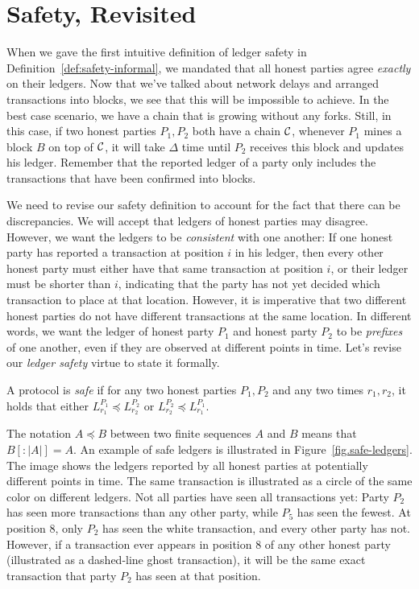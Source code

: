 \section{Safety, Revisited}

When we gave the first intuitive definition of ledger safety in Definition~\ref{def:safety-informal}, we mandated that all honest parties
agree \emph{exactly} on their ledgers. Now that we've talked about network delays and arranged transactions into blocks, we see
that this will be impossible to achieve. In the best case scenario, we have a chain that is growing without any forks. Still, in this
case, if two honest parties $P_1, P_2$ both have a chain $\mathcal{C}$, whenever $P_1$ mines a block $B$ on top of $\mathcal{C}$, it will take
$\Delta$ time until $P_2$ receives this block and updates his ledger. Remember that the reported ledger of a party only includes the
transactions that have been confirmed into blocks.

We need to revise our safety definition to account for the fact that there can be discrepancies. We will accept that ledgers of honest
parties may disagree. However, we want the ledgers to be \emph{consistent} with one another: If one honest party has reported a transaction
at position $i$ in his ledger, then every other honest party must either have that same transaction at position $i$, or their ledger
must be shorter than $i$, indicating that the party has not yet decided which transaction to place at that location. However, it is imperative
that two different honest parties do not have different transactions at the same location. In different words, we want the ledger of
honest party $P_1$ and honest party $P_2$ to be \emph{prefixes} of one another, even if they are observed at different points in time.
Let's revise our \emph{ledger safety} virtue to state it formally.

\begin{definition}[Safety]
  A protocol is \emph{safe} if
  for any two honest parties $P_1, P_2$ and any two times $r_1, r_2$, it holds that either
  $L^{P_1}_{r_1} \preccurlyeq L^{P_2}_{r_2}$ or $L^{P_2}_{r_2} \preccurlyeq L^{P_1}_{r_1}$.
\end{definition}

The notation $A \preccurlyeq B$ between two finite sequences $A$ and $B$ means that
$B[{:}|A|] = A$. An example of safe ledgers is illustrated in Figure~\ref{fig.safe-ledgers}.
The image shows the ledgers reported by all honest parties at potentially different points
in time. The same transaction is illustrated as a circle of the same color on different ledgers.
Not all parties have seen all transactions yet: Party $P_2$ has seen more transactions than
any other party, while $P_5$ has seen the fewest. At position $8$, only $P_2$ has seen the white
transaction, and every other party has not. However, if a transaction ever appears in position $8$
of any other honest party (illustrated as a dashed-line ghost transaction), it will be the same
exact transaction that party $P_2$ has seen at that position.


